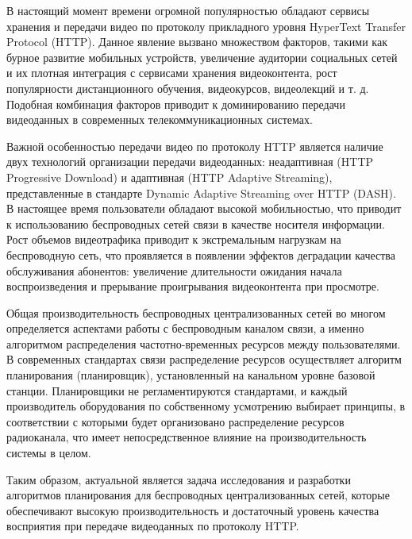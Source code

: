 {\actuality} В настоящий момент времени огромной популярностью обладают сервисы хранения и передачи видео по протоколу прикладного уровня HyperText Transfer Protocol (HTTP). Данное явление вызвано множеством факторов, такими как бурное развитие мобильных устройств, увеличение аудитории социальных сетей и их плотная интеграция с сервисами хранения видеоконтента, рост популярности дистанционного обучения, видеокурсов, видеолекций и т. д. Подобная комбинация факторов приводит к доминированию передачи видеоданных в современных телекоммуникационных системах.

Важной особенностью передачи видео по протоколу HTTP является наличие двух технологий организации передачи видеоданных: неадаптивная (HTTP Progressive Download) и адаптивная (HTTP Adaptive Streaming), представленные в стандарте Dynamic Adaptive Streaming over HTTP (DASH). В настоящее время пользователи обладают высокой мобильностью, что приводит к использованию беспроводных сетей связи в качестве носителя информации. Рост объемов видеотрафика приводит к экстремальным нагрузкам на беспроводную сеть, что проявляется в появлении эффектов деградации качества обслуживания абонентов: увеличение длительности ожидания начала воспроизведения и прерывание проигрывания видеоконтента при просмотре.

Общая производительность беспроводных централизованных сетей во многом определяется аспектами работы с беспроводным каналом связи, а именно алгоритмом распределения частотно-временных ресурсов между пользователями. В современных стандартах связи распределение ресурсов осуществляет алгоритм планирования (планировщик), установленный на канальном уровне базовой станции. Планировщики не регламентируются стандартами, и каждый производитель оборудования по собственному усмотрению выбирает принципы, в соответствии с которыми будет организовано распределение ресурсов радиоканала, что имеет непосредственное влияние на производительность системы в целом.

Таким образом, актуальной является задача исследования и разработки алгоритмов планирования для беспроводных централизованных сетей, которые обеспечивают высокую производительность и достаточный уровень качества восприятия при передаче видеоданных по протоколу HTTP.

